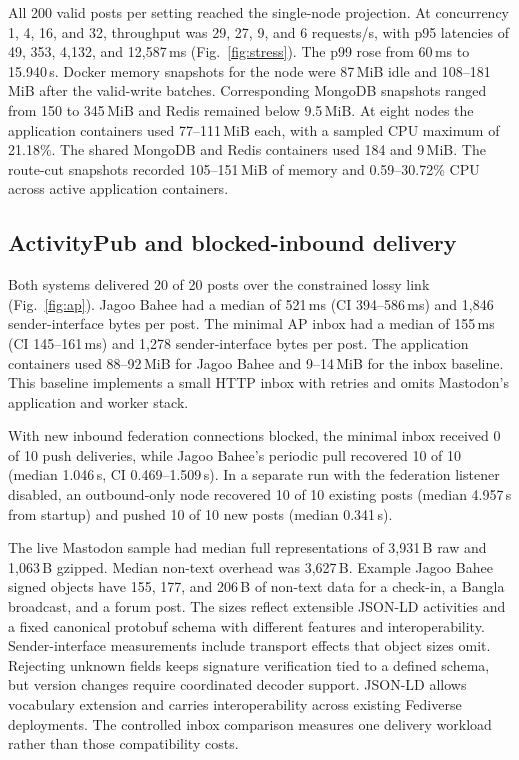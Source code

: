 \documentclass[conference,a4paper,10pt]{IEEEtran}
\begin{document}
All 200 valid posts per setting reached the single-node projection. At concurrency 1, 4, 16, and 32, throughput was 29, 27, 9, and 6 requests/s, with p95 latencies of 49, 353, 4,132, and 12,587\,ms (Fig.~\ref{fig:stress}). The p99 rose from 60\,ms to 15.940\,s. Docker memory snapshots for the node were 87\,MiB idle and 108--181\,MiB after the valid-write batches. Corresponding MongoDB snapshots ranged from 150 to 345\,MiB and Redis remained below 9.5\,MiB. At eight nodes the application containers used 77--111\,MiB each, with a sampled CPU maximum of 21.18\%. The shared MongoDB and Redis containers used 184 and 9\,MiB. The route-cut snapshots recorded 105--151\,MiB of memory and 0.59--30.72\% CPU across active application containers.

\subsection{ActivityPub and blocked-inbound delivery}

Both systems delivered 20 of 20 posts over the constrained lossy link (Fig.~\ref{fig:ap}). Jagoo Bahee had a median of 521\,ms (CI 394--586\,ms) and 1,846 sender-interface bytes per post. The minimal AP inbox had a median of 155\,ms (CI 145--161\,ms) and 1,278 sender-interface bytes per post. The application containers used 88--92\,MiB for Jagoo Bahee and 9--14\,MiB for the inbox baseline. This baseline implements a small HTTP inbox with retries and omits Mastodon's application and worker stack.

With new inbound federation connections blocked, the minimal inbox received 0 of 10 push deliveries, while Jagoo Bahee's periodic pull recovered 10 of 10 (median 1.046\,s, CI 0.469--1.509\,s). In a separate run with the federation listener disabled, an outbound-only node recovered 10 of 10 existing posts (median 4.957\,s from startup) and pushed 10 of 10 new posts (median 0.341\,s).

The live Mastodon sample had median full representations of 3,931\,B raw and 1,063\,B gzipped. Median non-text overhead was 3,627\,B. Example Jagoo Bahee signed objects have 155, 177, and 206\,B of non-text data for a check-in, a Bangla broadcast, and a forum post. The sizes reflect extensible JSON-LD activities and a fixed canonical protobuf schema with different features and interoperability. Sender-interface measurements include transport effects that object sizes omit. Rejecting unknown fields keeps signature verification tied to a defined schema, but version changes require coordinated decoder support. JSON-LD allows vocabulary extension and carries interoperability across existing Fediverse deployments. The controlled inbox comparison measures one delivery workload rather than those compatibility costs.
\end{document}
